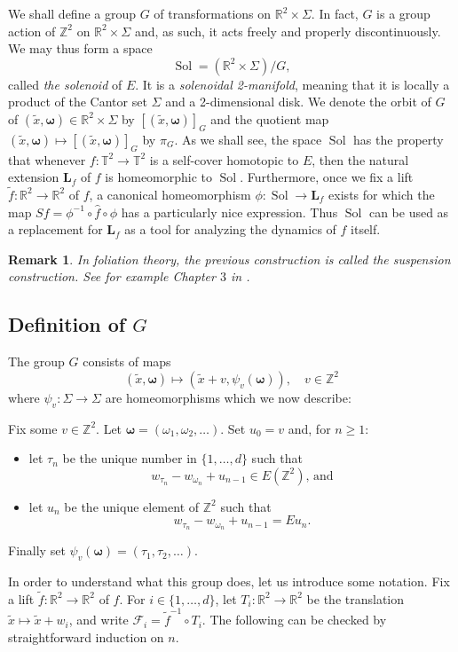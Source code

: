 \documentclass[11pt,letterpaper,reqno]{article}
\newtheorem{remark}{Remark}[section]
\newcommand{\TT}{\mathbb{T}^2}
\newcommand{\RR}{\mathbb{R}^2}
\newcommand{\ZZ}{\mathbb{Z}^2}
\newcommand{\hTTf}[1][f]{\mathbf{L}_{#1}}
\newcommand{\cF}{\mathcal{F}}
\newcommand{\tf}{\tilde{f}}
\newcommand{\tx}{\tilde{x}}
\newcommand{\bomega}{\boldsymbol{\omega}}
\newcommand{\hf}{\hat{f}}
\newcommand{\Sol}{\operatorname{Sol}}
\newcommand{\fsol}{Sf}
\begin{document}
We shall define a group $G$ of transformations on $\RR \times \Sigma$. In fact, $G$ is a group action of $\ZZ$ on $\RR \times \Sigma$ and, as such, it acts freely and properly discontinuously. We may thus form a space
\[ \Sol = (\RR \times \Sigma) / G,\]
called \emph{the solenoid} of $E$. It is a \emph{solenoidal 2-manifold}, meaning that it is locally a product of the Cantor set $\Sigma$ and a 2-dimensional disk. We denote the orbit of $G$ of $(\tx, \bomega) \in \RR \times \Sigma$ by $[(\tx, \bomega)]_G$ and the quotient map $(\tx, \bomega) \mapsto [(\tx, \bomega)]_G$ by $\pi_G$. As we shall see, the space $\Sol$ has the property that whenever $f: \TT \to \TT$ is a self-cover homotopic to $E$, then the natural extension $\hTTf$ of $f$ is homeomorphic to $\Sol$.  Furthermore, once we fix a lift $\tf: \RR \to \RR$ of $f$, a canonical homeomorphism $\phi: \Sol \to \hTTf$ exists for which the map $\fsol = \phi^{-1}\circ \hf \circ \phi$ has a particularly nice expression. Thus $\Sol$ can be used as a replacement for $\hTTf$ as a tool for analyzing the dynamics of $f$ itself. 


\begin{remark}
In foliation theory, the previous construction is called the suspension construction. See for example Chapter $3$ in \cite{Foliated}.
\end{remark}


\subsection{Definition of \texorpdfstring{$G$}{G}}
The group $G$ consists of maps 
\[(\tx, \bomega) \mapsto (\tx+v, \psi_v(\bomega)), \quad v \in \ZZ\] where $\psi_v: \Sigma \to \Sigma$ are homeomorphisms which we now describe:

Fix some $v \in \ZZ$. Let $\bomega = (\omega_1, \omega_2, \ldots)$. Set $u_0 = v$ and, for $n \geq 1$:
\begin{itemize}
\item let $\tau_n$ be the unique number in $\{1, \ldots, d\}$ such that 
\[w_{\tau_n}-w_{\omega_n}+u_{n-1} \in E(\ZZ) \text{, and}\]
\item let $u_n$ be the unique element of $\ZZ$ such that 
\[w_{\tau_n}-w_{\omega_n}+u_{n-1} = E u_n.\]
\end{itemize} 
Finally set $\psi_v(\bomega) = (\tau_1, \tau_2, \ldots)$.

In order to understand what this group does, let us introduce some notation. Fix a lift $\tf: \RR \to \RR$ of $f$. For $i \in \{1, \ldots, d\}$, let $T_i: \RR \to \RR$ be the translation $\tx \mapsto \tx+w_i$, and write $\cF_i = \tf^{-1}\circ  T_i$. The following can be checked by straightforward induction on $n$.
\end{document}
